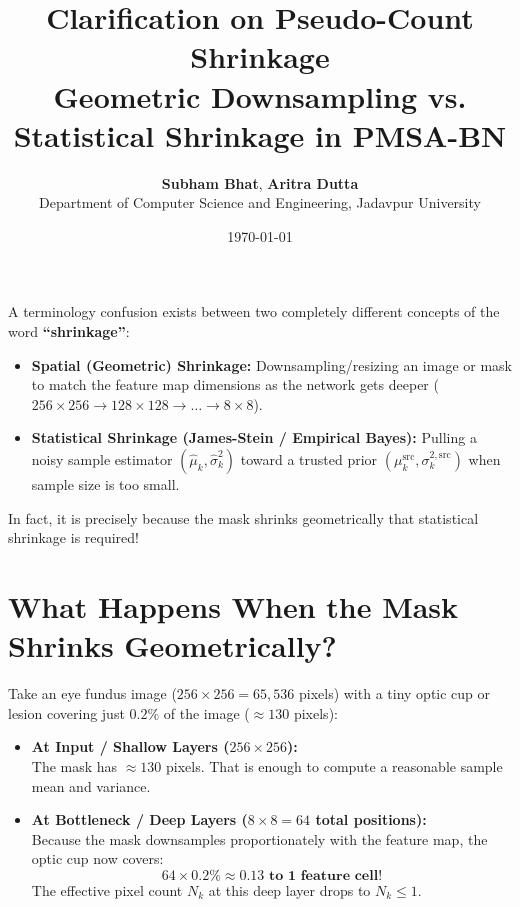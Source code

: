 \documentclass[11pt,a4paper]{article}
\title{\textbf{Clarification on Pseudo-Count Shrinkage}\\
\large Geometric Downsampling vs. Statistical Shrinkage in PMSA-BN}
\author{\textbf{Subham Bhat}, \textbf{Aritra Dutta}\\
Department of Computer Science and Engineering, Jadavpur University}
\date{\today}
\begin{document}
\maketitle

A terminology confusion exists between two completely different concepts of the word \textbf{``shrinkage''}:

\begin{itemize}
    \item \textbf{Spatial (Geometric) Shrinkage:} Downsampling/resizing an image or mask to match the feature map dimensions as the network gets deeper ($256 \times 256 \to 128 \times 128 \to \dots \to 8 \times 8$).
    \item \textbf{Statistical Shrinkage (James-Stein / Empirical Bayes):} Pulling a noisy sample estimator $(\hat{\mu}_k, \hat{\sigma}^2_k)$ toward a trusted prior $(\mu_k^{\mathrm{src}}, \sigma_k^{2,\mathrm{src}})$ when sample size is too small.
\end{itemize}

\begin{tcolorbox}
In fact, it is precisely because the mask shrinks geometrically that statistical shrinkage is required!
\end{tcolorbox}

\section{What Happens When the Mask Shrinks Geometrically?}

Take an eye fundus image ($256 \times 256 = 65{,}536$ pixels) with a tiny optic cup or lesion covering just $0.2\%$ of the image ($\approx 130$ pixels):

\begin{itemize}
    \item \textbf{At Input / Shallow Layers ($256 \times 256$):}\\
    The mask has $\approx 130$ pixels. That is enough to compute a reasonable sample mean and variance.
    
    \item \textbf{At Bottleneck / Deep Layers ($8 \times 8 = 64$ total positions):}\\
    Because the mask downsamples proportionately with the feature map, the optic cup now covers:
    \begin{equation}
        64 \times 0.2\% \approx \mathbf{0.13 \text{ to } 1 \text{ feature cell!}}
    \end{equation}
    The effective pixel count $N_k$ at this deep layer drops to $N_k \le 1$.
\end{itemize}
\end{document}
